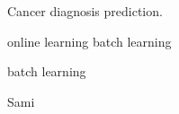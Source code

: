 \begin{parts}
\begin{subparts}
    \subpart[1] Cancer diagnosis prediction.
    \begin{checkboxes}
     \choice online learning
     \choice batch learning
    \end{checkboxes}
    \begin{soln}
    batch learning
    \end{soln}
    \begin{qauthor}    Sami    \end{qauthor}

\end{subparts}


\end{parts}